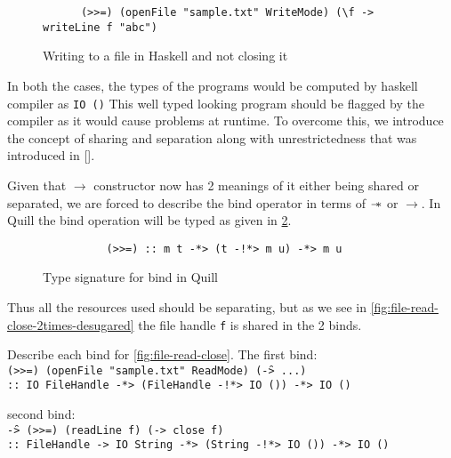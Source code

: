 \begin{figure}[h]
  \begin{framed}
    \begin{verbatim}
      (>>=) (openFile "sample.txt" WriteMode) (\f -> writeLine f "abc")
    \end{verbatim}
  \end{framed}
  \caption{Writing to a file in Haskell and not closing it}
  \label{fig:file-read-noclose-desugared}
\end{figure}

In both the cases, the types of the programs would be computed by haskell compiler as \texttt{IO ()}
This well typed looking program should be flagged by the compiler as it would cause problems at runtime.
To overcome this, we introduce the concept of sharing and separation along with
unrestrictedness that was introduced in [\cite{morris_best_2016}].

Given that $\rightarrow$ constructor now has 2 meanings of it either being shared or separated, we are
forced to describe the bind operator in terms of $\mathrel{-\mkern-6mu*}$ or $\rightarrow$. In Quill the bind operation will
be typed as  given in \cref{fig:quill-bind-type}.
\begin{figure}[h]
  \begin{framed}
    \begin{verbatim}
          (>>=) :: m t -*> (t -!*> m u) -*> m u
    \end{verbatim}
  \end{framed}
  \caption{Type signature for bind in Quill}
  \label{fig:quill-bind-type}
\end{figure}
Thus all the resources used should be separating, but as we see in \cref{fig:file-read-close-2times-desugared} the file handle
\texttt{f} is shared in the 2 binds.

Describe each bind for \cref{fig:file-read-close}.
The first bind:\\
\texttt{(>>=) (openFile "sample.txt" ReadMode) (\f -> ...)}\\
\texttt{:: IO FileHandle -*> (FileHandle -!*> IO ()) -*> IO ()}

second bind:\\
\texttt{\f -> (>>=) (readLine f) (\s -> close f)}\\
\texttt{:: FileHandle -> IO String -*> (String -!*> IO ()) -*> IO ()}


